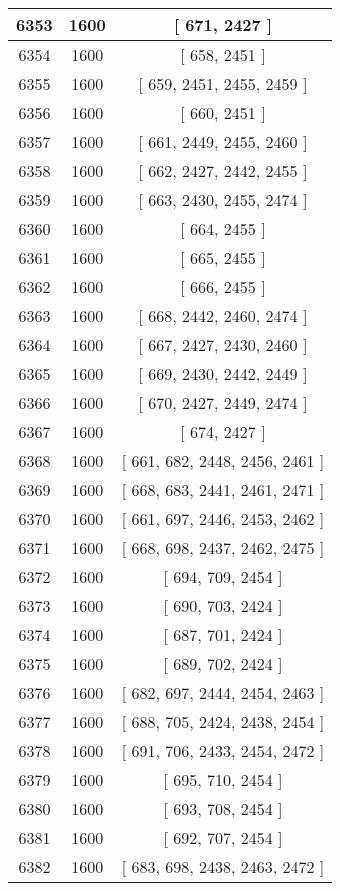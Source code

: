 \begin{center}
\begin{longtable}[H]{|| c c c ||}
\hline
6353 & 1600 & [ 671, 2427 ] \\ 
\hline
6354 & 1600 & [ 658, 2451 ] \\ 
\hline
6355 & 1600 & [ 659, 2451, 2455, 2459 ] \\ 
\hline
6356 & 1600 & [ 660, 2451 ] \\ 
\hline
6357 & 1600 & [ 661, 2449, 2455, 2460 ] \\ 
\hline
6358 & 1600 & [ 662, 2427, 2442, 2455 ] \\ 
\hline
6359 & 1600 & [ 663, 2430, 2455, 2474 ] \\ 
\hline
6360 & 1600 & [ 664, 2455 ] \\ 
\hline
6361 & 1600 & [ 665, 2455 ] \\ 
\hline
6362 & 1600 & [ 666, 2455 ] \\ 
\hline
6363 & 1600 & [ 668, 2442, 2460, 2474 ] \\ 
\hline
6364 & 1600 & [ 667, 2427, 2430, 2460 ] \\ 
\hline
6365 & 1600 & [ 669, 2430, 2442, 2449 ] \\ 
\hline
6366 & 1600 & [ 670, 2427, 2449, 2474 ] \\ 
\hline
6367 & 1600 & [ 674, 2427 ] \\ 
\hline
6368 & 1600 & [ 661, 682, 2448, 2456, 2461 ] \\ 
\hline
6369 & 1600 & [ 668, 683, 2441, 2461, 2471 ] \\ 
\hline
6370 & 1600 & [ 661, 697, 2446, 2453, 2462 ] \\ 
\hline
6371 & 1600 & [ 668, 698, 2437, 2462, 2475 ] \\ 
\hline
6372 & 1600 & [ 694, 709, 2454 ] \\ 
\hline
6373 & 1600 & [ 690, 703, 2424 ] \\ 
\hline
6374 & 1600 & [ 687, 701, 2424 ] \\ 
\hline
6375 & 1600 & [ 689, 702, 2424 ] \\ 
\hline
6376 & 1600 & [ 682, 697, 2444, 2454, 2463 ] \\ 
\hline
6377 & 1600 & [ 688, 705, 2424, 2438, 2454 ] \\ 
\hline
6378 & 1600 & [ 691, 706, 2433, 2454, 2472 ] \\ 
\hline
6379 & 1600 & [ 695, 710, 2454 ] \\ 
\hline
6380 & 1600 & [ 693, 708, 2454 ] \\ 
\hline
6381 & 1600 & [ 692, 707, 2454 ] \\ 
\hline
6382 & 1600 & [ 683, 698, 2438, 2463, 2472 ] \\ 

\end{longtable}
\end{center}
